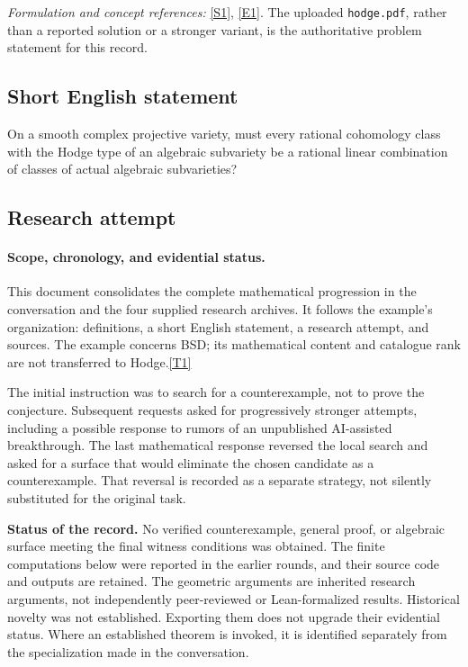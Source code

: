 \documentclass[11pt]{article}
\newcommand{\src}[1]{\hyperlink{src:#1}{[#1]}}
\begin{document}
\par\smallskip\textit{Formulation and concept references:}
\href{https://www.claymath.org/library/monographs/MPPc.pdf}{[S1]},
\href{https://www.claymath.org/wp-content/uploads/2022/06/hodge.pdf}{[E1]}.
The uploaded \texttt{hodge.pdf}, rather than a reported solution or a stronger
variant, is the authoritative problem statement for this record.

\subsection{Short English statement}
On a smooth complex projective variety, must every rational cohomology class
with the Hodge type of an algebraic subvariety be a rational linear combination
of classes of actual algebraic subvarieties?

\subsection{Research attempt}
\paragraph{Scope, chronology, and evidential status.}
This document consolidates the complete mathematical progression in the
conversation and the four supplied research archives. It follows the example's
organization: definitions, a short English statement, a research attempt, and
sources. The example concerns BSD; its mathematical content and catalogue rank
are not transferred to Hodge.\src{T1}

The initial instruction was to search for a counterexample, not to prove the
conjecture. Subsequent requests asked for progressively stronger attempts,
including a possible response to rumors of an unpublished AI-assisted
breakthrough. The last mathematical response reversed the local search and
asked for a surface that would eliminate the chosen candidate as a
counterexample. That reversal is recorded as a separate strategy, not
silently substituted for the original task.

\textbf{Status of the record.} No verified counterexample, general proof,
or algebraic surface meeting the final witness conditions was obtained.
The finite computations below were reported in the earlier rounds, and their
source code and outputs are retained. The geometric arguments are inherited
research arguments, not independently peer-reviewed or Lean-formalized
results. Historical novelty was not established. Exporting them does not
upgrade their evidential status. Where an established theorem is invoked, it
is identified separately from the specialization made in the conversation.
\end{document}
